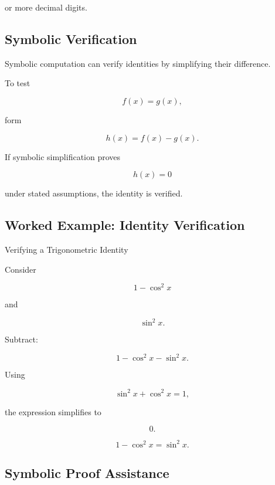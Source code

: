 or more decimal digits.

\subsection{Symbolic Verification}
\label{subsec:symbolic-verification}

Symbolic computation can verify identities by simplifying their
difference.

To test

\[
f(x)=g(x),
\]

form

\[
\boxed{
h(x)
=
f(x)-g(x).
}
\]

If symbolic simplification proves

\[
\boxed{
h(x)=0
}
\]

under stated assumptions, the identity is verified.

\subsection{Worked Example: Identity Verification}
\label{subsec:worked-symbolic-identity}

\begin{workedexamplebox}{Verifying a Trigonometric Identity}

Consider

\[
1-\cos^2x
\]

and

\[
\sin^2x.
\]

Subtract:

\[
1-\cos^2x-\sin^2x.
\]

Using

\[
\sin^2x+\cos^2x=1,
\]

the expression simplifies to

\[
0.
\]

\begin{answerbox}
\[
\boxed{
1-\cos^2x
=
\sin^2x.
}
\]
\end{answerbox}

\end{workedexamplebox}

\subsection{Symbolic Proof Assistance}
\label{subsec:symbolic-proof-assistance}

